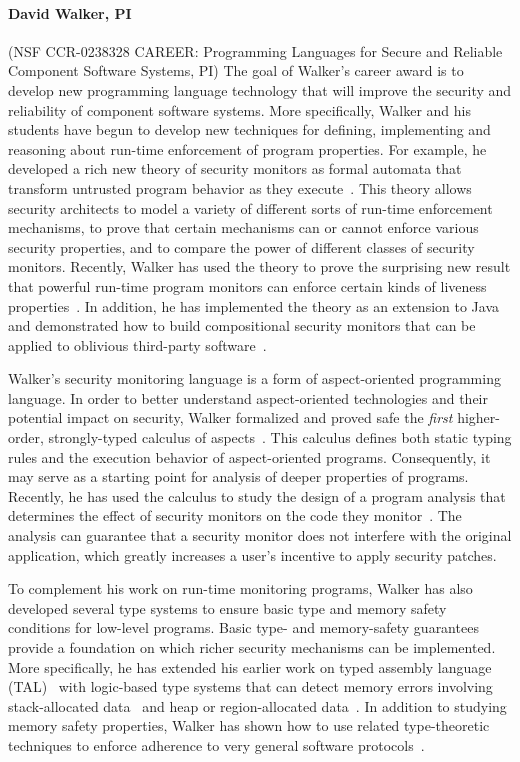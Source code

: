 \documentclass[11pt]{article}
\begin{document}
%

\paragraph*{David Walker, PI} (NSF CCR-0238328 CAREER: Programming Languages for Secure and Reliable Component Software
Systems, PI)
The goal of Walker's career award is to develop new programming language
technology that will improve the security and reliability of component software systems.
More specifically, Walker and his students have begun to develop new techniques for defining,
implementing and reasoning about run-time enforcement of program properties.
For example, he developed a rich new theory of security monitors as formal
automata that transform untrusted program behavior as they 
execute~\cite{ligatti+:edit-automata}.
This theory allows security
architects to model a variety of different sorts of run-time
enforcement mechanisms, to prove that certain mechanisms can or cannot
enforce various security properties, and to compare the power of
different classes of security monitors.    Recently, Walker 
has used the theory to prove the surprising new result that powerful run-time
program monitors can enforce certain kinds of liveness properties~\cite{ligatti+:renewal}.  
In addition, he has implemented the theory as an extension to Java and demonstrated
how to build compositional security monitors that can be applied to oblivious third-party 
software~\cite{bauer+:polymer}.

Walker's security monitoring language is a form of aspect-oriented programming language.
In order to better understand aspect-oriented technologies and their
potential impact on security, Walker formalized and proved
safe the {\em first} higher-order, strongly-typed calculus of 
aspects~\cite{walker+:aspects}.  This calculus defines
both static typing rules and the execution behavior of aspect-oriented
programs.  Consequently, it may
serve as a starting point for analysis of deeper properties of programs.
Recently, he has used the calculus to study the design of a
program analysis that determines the effect of security monitors on
the code they monitor~\cite{dantas+:harmless-advice}.   The analysis
can guarantee that a security monitor does not interfere with the 
original application, which greatly increases a user's incentive
to apply security patches.

To complement his work on run-time monitoring programs, Walker has also
developed several type systems to ensure basic type and memory safety conditions
for low-level programs.  Basic type- and memory-safety guarantees provide a foundation on which
richer security mechanisms can be implemented.  More specifically, he
has extended his earlier work on typed assembly language (TAL)~\cite{morrisett+:tal,morrisett+:journal-stal} with
logic-based type systems that can detect memory errors involving
stack-allocated data~\cite{ahmed+:stack} and heap or region-allocated
data~\cite{ahmed+:hierarchical-storage}.  In addition to studying memory safety
properties, Walker has shown how to use related type-theoretic techniques
to enforce adherence to very general software
protocols~\cite{mandelbaum+:refinements}.  
\end{document}
